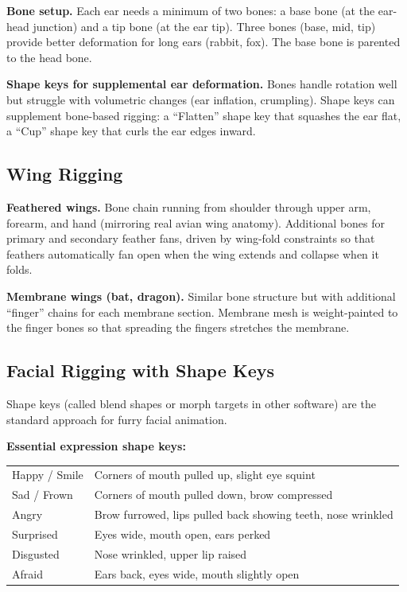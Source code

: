 \textbf{Bone setup.} Each ear needs a minimum of two bones: a base bone (at the ear-head junction) and a tip bone (at the ear tip). Three bones (base, mid, tip) provide better deformation for long ears (rabbit, fox). The base bone is parented to the head bone.

\textbf{Shape keys for supplemental ear deformation.} Bones handle rotation well but struggle with volumetric changes (ear inflation, crumpling). Shape keys can supplement bone-based rigging: a ``Flatten'' shape key that squashes the ear flat, a ``Cup'' shape key that curls the ear edges inward.


\subsection{Wing Rigging}

\textbf{Feathered wings.} Bone chain running from shoulder through upper arm, forearm, and hand (mirroring real avian wing anatomy). Additional bones for primary and secondary feather fans, driven by wing-fold constraints so that feathers automatically fan open when the wing extends and collapse when it folds.

\textbf{Membrane wings (bat, dragon).} Similar bone structure but with additional ``finger'' chains for each membrane section. Membrane mesh is weight-painted to the finger bones so that spreading the fingers stretches the membrane.


\subsection{Facial Rigging with Shape Keys}

Shape keys (called blend shapes or morph targets in other software) are the standard approach for furry facial animation.

\textbf{Essential expression shape keys:}

\begin{center}
\begin{tabularx}{\textwidth}{L{3cm}X}
\toprule
{}
 &  \\
\midrule
Happy / Smile & Corners of mouth pulled up, slight eye squint \\
Sad / Frown & Corners of mouth pulled down, brow compressed \\
Angry & Brow furrowed, lips pulled back showing teeth, nose wrinkled \\
Surprised & Eyes wide, mouth open, ears perked \\
Disgusted & Nose wrinkled, upper lip raised \\
Afraid & Ears back, eyes wide, mouth slightly open \\
\bottomrule
\end{tabularx}
\end{center}

